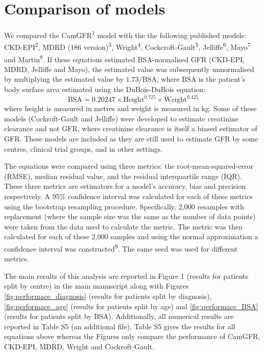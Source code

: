 \documentclass[11pt,]{article}
\begin{document}
\section{Comparison of models}\label{comparison-of-models}

We compared the CamGFR\textsuperscript{1} model with the the following
published models: CKD-EPI\textsuperscript{2}, MDRD (186
version)\textsuperscript{3}, Wright\textsuperscript{4},
Cockcroft-Gault\textsuperscript{5}, Jelliffe\textsuperscript{6},
Mayo\textsuperscript{7} and Martin\textsuperscript{8}. If these
equations estimated BSA-normalised GFR (CKD-EPI, MDRD, Jelliffe and
Mayo), the estimated value was subsequently unnormalised by multiplying
the estimated value by \(1.73/\textrm{BSA}\), where \(\textrm{BSA}\) is
the patient's body surface area estimated using the DuBois-DuBois
equation:
\[\textrm{BSA} = 0.20247 \times \textrm{Height}^{0.725} \times \textrm{Weight}^{0.425}\]
where height is measured in metres and weight is measured in kg. Some of
these models (Cockroft-Gault and Jelliffe) were developed to estimate
creatinine clearance and not GFR, where creatinine clearance is itself a
biased estimator of GFR. These models are included as they are still
used to estimate GFR by some centres, clinical trial groups, and in
other settings.

The equations were compared using three metrics: the
root-mean-squared-error (RMSE), median residual value, and the residual
interquartile range (IQR). These three metrics are estimators for a
model's accuracy, bias and precision respectively. A 95\% confidence
interval was calculated for each of these metrics using the bootstrap
resampling procedure. Specifically, 2,000 resamples with replacement
(where the sample size was the same as the number of data points) were
taken from the data used to calculate the metric. The metric was then
calculated for each of these 2,000 samples and using the normal
approximation a confidence interval was constructed\textsuperscript{9}.
The same seed was used for different metrics.

The main results of this analysis are reported in Figure 1 (results for
patients split by centre) in the main manuscript along with Figures
\ref{fig:performace_diagnosis} (results for patients split by
diagnosis), \ref{fig:performace_age} (results for patients split by age)
and \ref{fig:performace_BSA} (results for patients split by BSA).
Additionally, all numerical results are reported in Table S5 (an
additional file). Table S5 gives the results for all equations above
whereas the Figures only compare the performance of CamGFR, CKD-EPI,
MDRD, Wright and Cockroft-Gault.
\end{document}
